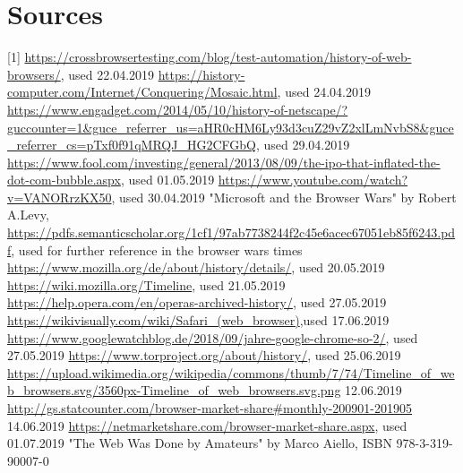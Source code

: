 \documentclass[runningheads]{llncs}
\begin{document}
	\section{Sources}
	[1] \url{https://crossbrowsertesting.com/blog/test-automation/history-of-web-browsers/}, used 22.04.2019
	\newline
	[2] \url{https://history-computer.com/Internet/Conquering/Mosaic.html}, used 24.04.2019
	\newline
	[3] \url{https://www.engadget.com/2014/05/10/history-of-netscape/?guccounter=1&guce_referrer_us=aHR0cHM6Ly93d3cuZ29vZ2xlLmNvbS8&guce_referrer_cs=pTxf0f91qMRQJ_HG2CFGbQ}, used 29.04.2019
	\newline
	[4] \url{https://www.fool.com/investing/general/2013/08/09/the-ipo-that-inflated-the-dot-com-bubble.aspx}, used 01.05.2019
	\newline
	[5] \url{https://www.youtube.com/watch?v=VANORrzKX50}, used 30.04.2019
	\newline
	[6] "Microsoft and the Browser Wars" by Robert A.Levy, \url{https://pdfs.semanticscholar.org/1cf1/97ab7738244f2c45e6acec67051eb85f6243.pdf}, used for further reference in the browser wars times
	\newline
	[7] \url{https://www.mozilla.org/de/about/history/details/}, used 20.05.2019
	\newline
	[8] \url{https://wiki.mozilla.org/Timeline}, used 21.05.2019
	\newline
	[9] \url{
		https://help.opera.com/en/operas-archived-history/}, used 27.05.2019
	\newline
	[10] \url{
		https://wikivisually.com/wiki/Safari_(web_browser)},used 17.06.2019
	\newline
	[11] \url{
		https://www.googlewatchblog.de/2018/09/jahre-google-chrome-so-2/}, used 27.05.2019
	\newline
	[12] \url{https://www.torproject.org/about/history/}, used 25.06.2019
	\newline
	[13]\url{https://upload.wikimedia.org/wikipedia/commons/thumb/7/74/Timeline_of_web_browsers.svg/3560px-Timeline_of_web_browsers.svg.png} 12.06.2019
	\newline
	[14] \url{http://gs.statcounter.com/browser-market-share#monthly-200901-201905} 14.06.2019
	\newline
	[15] \url{https://netmarketshare.com/browser-market-share.aspx}, used 01.07.2019
	\newline
	[16] "The Web Was Done by Amateurs" by Marco Aiello, ISBN 978-3-319-90007-0
	\newline
\end{document}
